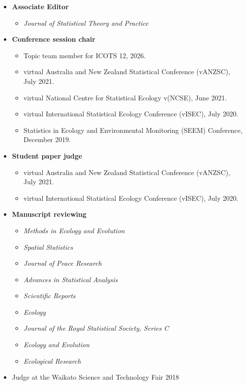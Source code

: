 \documentclass[10pt,a4paper]{moderncv}
\begin{document}
\begin{itemize}
\item \textbf{Associate Editor}
  \begin{itemize}
  \item \textit{Journal of Statistical Theory and Practice}
  \end{itemize}
\item \textbf{Conference session chair}
  \begin{itemize}
  \item Topic team member for ICOTS 12, 2026.
  \item virtual Australia and New Zealand Statistical Conference (vANZSC), July 2021.
  \item virtual National Centre for Statistical Ecology v(NCSE), June 2021.
  \item virtual International Statistical Ecology Conference (vISEC), July 2020.
  \item Statistics in Ecology and Environmental Monitoring (SEEM) Conference, December 2019.
  \end{itemize}
\item \textbf{Student paper judge}
  \begin{itemize}
  \item virtual Australia and New Zealand Statistical Conference (vANZSC), July 2021.
  \item virtual International Statistical Ecology Conference (vISEC), July 2020.
  \end{itemize}
\item \textbf{Manuscript reviewing}
  \begin{itemize}
  \item \textit{Methods in Ecology and Evolution}
  \item \textit{Spatial Statistics}
  \item \textit{Journal of Peace Research}
  \item \textit{Advances in Statistical Analysis}
  \item   \textit{Scientific Reports}
  \item \textit{Ecology}
  \item  \textit{Journal of the Royal Statistical Society, Series C}
  \item   \textit{Ecology and Evolution}
  \item   \textit{Ecological Research}
  \end{itemize}
  \item Judge at the Waikato Science and Technology Fair 2018
\end{itemize}
\end{document}
